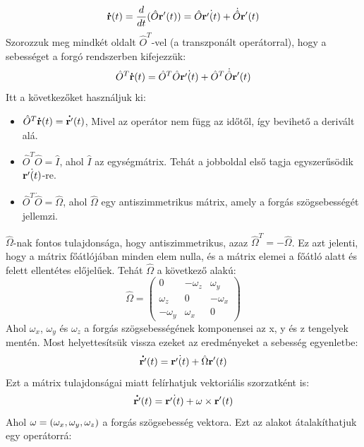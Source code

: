 \documentclass[a4paper,12pt]{article}
\begin{document}
\begin{equation}
    \bold{\dot{r}}(t) = \frac{d}{dt}(\hat{O}\bold{r'}(t)) = \hat{O}\dot{\bold{r'}(t)} + \dot{\hat{O}}\bold{r'}(t)
\end{equation}
Szorozzuk meg mindkét oldalt $\hat{O}^T$-vel (a transzponált operátorral), hogy a sebességet a forgó rendszerben kifejezzük:
\begin{equation}
    \hat{O}^T\bold{\dot{r}}(t) = \hat{O}^T\hat{O}\dot{\bold{r'}(t)} + \hat{O}^T\dot{\hat{O}}\bold{r'}(t)
\end{equation}
Itt a következőket használjuk ki:
\begin{itemize}
    \item $\hat{O}^T\bold{\dot{r}}(t) = \bold{\dot{r'}}(t)$, Mivel az operátor nem függ az időtől, így bevihető a derivált alá.
    \item $\hat{O}^T\hat{O} = \hat{I}$, ahol $\hat{I}$ az egységmátrix. Tehát a jobboldal első tagja egyszerűsödik $\dot{\bold{r'}(t)}$-re.
    \item $\hat{O}^T\dot{\hat{O}} = \hat{\Omega}$, ahol $\hat{\Omega}$ egy antiszimmetrikus mátrix, amely a forgás szögsebességét jellemzi.
\end{itemize}
$\hat{\Omega}$-nak fontos tulajdonsága, hogy antiszimmetrikus, azaz $\hat{\Omega}^T = -\hat{\Omega}$. Ez azt jelenti, hogy a mátrix főátlójában minden elem nulla, és a mátrix elemei a főátló alatt és felett ellentétes előjelűek.
Tehát $\hat{\Omega}$ a következő alakú:
\begin{equation}
    \hat{\Omega} = \begin{pmatrix}
    0 & -\omega_z & \omega_y \\
    \omega_z & 0 & -\omega_x \\
    -\omega_y & \omega_x & 0
    \end{pmatrix}
\end{equation}
Ahol $\omega_x$, $\omega_y$ és $\omega_z$ a forgás szögsebességének komponensei az x, y és z tengelyek mentén.
Most helyettesítsük vissza ezeket az eredményeket a sebesség egyenletbe:
\begin{equation}
    \bold{\dot{r'}}(t) = \dot{\bold{r'}(t)} + \hat{\Omega}\bold{r'}(t)
\end{equation}
Ezt a mátrix tulajdonságai miatt felírhatjuk vektoriális szorzatként is:
\begin{equation}
    \bold{\dot{r'}}(t) = \dot{\bold{r'}(t)} + \bold{\omega} \times \bold{r'}(t)
\end{equation}
Ahol $\bold{\omega} = (\omega_x, \omega_y, \omega_z)$ a forgás szögsebesség vektora. Ezt az alakot átalakíthatjuk egy operátorrá:
\end{document}
